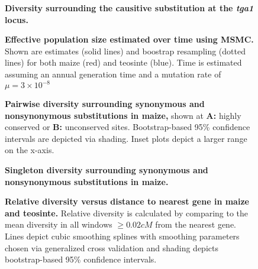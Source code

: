 \renewcommand\thefigure{S\arabic{figure}}
\renewcommand\thetable{S\arabic{table}}    
\setcounter{figure}{0}
\setcounter{table}{0}


\begin{figure}[h!]
\caption{ {\bf Diversity surrounding the causitive substitution at the \emph{tga1} locus.}  \label{sFig:tga1}}
\end{figure}


\begin{figure}[h!]
\caption{{ \bf Effective population size estimated over time using MSMC.} Shown are estimates (solid lines) and boostrap resampling (dotted lines) for both maize (red) and teosinte (blue). Time is estimated assuming an annual generation time and a mutation rate of $\mu=3\times 10^{-8}$ \label{sFig:msmc}}
\end{figure}



\begin{figure}[h!]
\caption{{ \bf Pairwise diversity surrounding synonymous and nonsynonymous substitutions in maize,} shown at \textbf{A:} highly conserved or \textbf{B:}  unconserved sites.  Bootstrap-based 95\% confidence intervals are depicted via shading. Inset plots depict a larger range on the x-axis. \label{sFig:consUncons}}
\end{figure}



\begin{figure}[h!]
\caption{{ \bf Singleton diversity surrounding synonymous and nonsynonymous substitutions in maize. \label{sFig:singleton}}}
\end{figure}




\begin{figure}[h!]
\caption{ { \bf Relative diversity versus distance to nearest gene in maize and teosinte.} Relative diversity is calculated by comparing to the mean diversity in all windows $\geq 0.02 cM$ from the nearest gene. Lines depict cubic smoothing splines with smoothing parameters chosen via generalized cross validation and shading depicts bootstrap-based 95\% confidence intervals.  \label{sFig:singletonPi}}
\end{figure}





